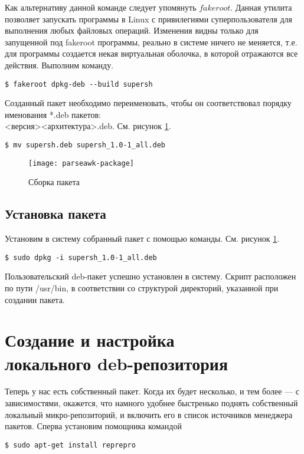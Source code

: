 \documentclass[a4paper,14pt]{extarticle}
\begin{document}
Как альтернативу данной команде следует упомянуть $fakeroot$. Данная утилита позволяет запускать программы в Linux с привилегиями суперпользователя для выполнения любых файловых операций. Изменения видны только для запущенной под fakeroot программы, реально в системе ничего не меняется, т.е. для программы создается некая виртуальная оболочка, в которой отражаются все действия.
Выполним команду.
\begin{lstlisting}
$ fakeroot dpkg-deb --build supersh
\end{lstlisting}

Созданный пакет необходимо переименовать, чтобы он соответствовал порядку именования *.deb
пакетов:\\<имя пакета><версия><архитектура>.deb.  См. рисунок \ref{img:parseawk-package}.
\begin{lstlisting}
$ mv supersh.deb supersh_1.0-1_all.deb
\end{lstlisting}
\begin{figure}[hpbt]
	\centering
	\texttt{[image: parseawk-package]}
	\caption{Сборка пакета}
	\label{img:parseawk-package}
\end{figure}

\subsection{Установка пакета}
Установим в систему собранный пакет с помощью команды. См. рисунок \ref{img:parseawk-package}.
\begin{lstlisting}
$ sudo dpkg -i supersh_1.0-1_all.deb
\end{lstlisting}

Пользовательский deb-пакет успешно установлен в систему. Скрипт расположен по пути /usr/bin, в соответствии со структурой директорий, указанной при создании пакета.
\section{Создание и настройка\\локального deb-репозитория}
Теперь у нас есть собственный пакет. Когда их будет несколько, и тем более — с зависимостями,
окажется, что намного удобнее быстренько поднять собственный локальный микро-репозиторий, и
включить его в список источников менеджера пакетов. Сперва установим помощника командой 
\begin{lstlisting}
$ sudo apt-get install reprepro
\end{lstlisting}
\end{document}
